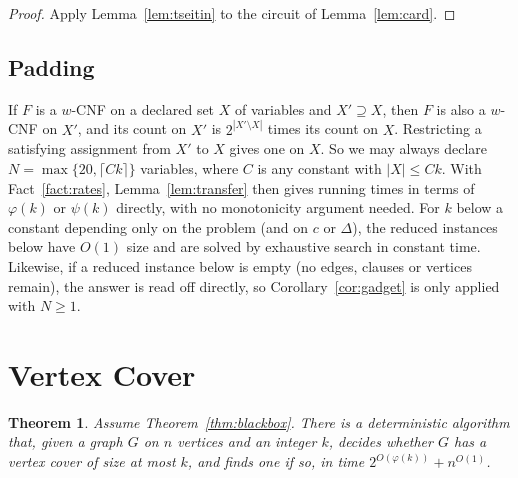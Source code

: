 \documentclass[11pt]{amsart}
\newtheorem{theorem}{Theorem}[section]
\theoremstyle{definition}
\theoremstyle{remark}
\begin{document}
\begin{proof}
Apply Lemma~\ref{lem:tseitin} to the circuit of Lemma~\ref{lem:card}.
\end{proof}

\subsection{Padding}
If $F$ is a $w$-CNF on a declared set $X$ of variables and $X'\supseteq X$, then $F$ is also a $w$-CNF on $X'$, and its count on $X'$ is $2^{|X'\setminus X|}$ times its count on $X$. Restricting a satisfying assignment from $X'$ to $X$ gives one on $X$. So we may always declare $N=\max\{20,\lceil Ck\rceil\}$ variables, where $C$ is any constant with $|X|\le Ck$. With Fact~\ref{fact:rates}, Lemma~\ref{lem:transfer} then gives running times in terms of $\varphi(k)$ or $\psi(k)$ directly, with no monotonicity argument needed. For $k$ below a constant depending only on the problem (and on $c$ or $\Delta$), the reduced instances below have $O(1)$ size and are solved by exhaustive search in constant time. Likewise, if a reduced instance below is empty (no edges, clauses or vertices remain), the answer is read off directly, so Corollary~\ref{cor:gadget} is only applied with $N\ge1$.

\section{Vertex Cover}

\begin{theorem}\label{thm:vc}
Assume Theorem~\ref{thm:blackbox}. There is a deterministic algorithm that, given a graph $G$ on $n$ vertices and an integer $k$, decides whether $G$ has a vertex cover of size at most $k$, and finds one if so, in time $2^{O(\varphi(k))}+n^{O(1)}$.
\end{theorem}
\end{document}

